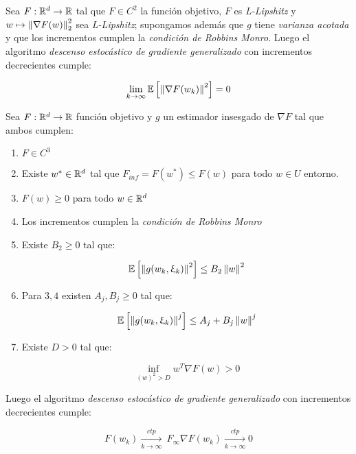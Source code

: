 \begin{theorem}
	Sea $F: {\mathbb{R}}^d \rightarrow {\mathbb{R}}$ tal que $F \in C^2$ la funci\'on objetivo, $F$ es \textit{L-Lipshitz} y $w \mapsto \left\lVert\nabla F (w)\right\rVert_2^2$ sea \textit{L-Lipshitz}; supongamos adem\'as que $g$ tiene \textit{varianza acotada} y que los incrementos cumplen la \textit{condici\'on de Robbins Monro}. Luego el algoritmo \textit{descenso estoc\'astico de gradiente generalizado} con incrementos decrecientes cumple:
	
	\begin{equation*}
	\lim\limits_{k \rightarrow \infty} \mathbb{E} \left[\left\lVert\nabla F (w_k)\right\rVert^2\right] = 0
	\end{equation*}
	
\end{theorem}

\begin{theorem}
	Sea $F: {\mathbb{R}}^d \rightarrow {\mathbb{R}}$  funci\'on objetivo y  $g$ un estimador insesgado de $\nabla F$ tal que ambos cumplen:
	
		\begin{enumerate}
		\item $F \in C^3$
		\item Existe $w^* \in {\mathbb{R}}^d$ tal que $F_{inf} = F(w^*) \leq F(w)$ para todo $w \in U$ entorno.
		\item $F(w) \geq 0$ para todo $w \in {\mathbb{R}}^d$
		\item Los incrementos cumplen la \textit{condici\'on de Robbins Monro}
		\item Existe $B_2 \geq 0$ tal que:
		
		\begin{equation*}
		\mathbb{E} \left[\left\lVert g(w_k, \upxi_{k})\right\rVert^2\right] \leq B_2 \left\lVert w\right\rVert^2
		\end{equation*}		
		
		\item Para $3, 4$ existen $A_j,B_j \geq 0$ tal que:
		
		\begin{equation*}
		\mathbb{E} \left[\left\lVert g(w_k, \upxi_{k})\right\rVert^j\right] \leq A_j + B_j \left\lVert w\right\rVert^j
		\end{equation*}
		
		\item  Existe $D > 0$ tal que:
		
		\begin{equation*}
		\inf\limits_{(w)^2 > D} {w^T \nabla F(w)} >0
		\end{equation*}
	\end{enumerate}
	
	
	Luego el algoritmo \textit{descenso estoc\'astico de gradiente generalizado} con incrementos decrecientes cumple:
	
	\begin{subequations}
		\begin{equation*}
		F(w_k) \xrightarrow[k \rightarrow \infty]{ctp} \ F_{\infty}
		\end{equation*}
		\begin{equation*}
		\nabla F(w_k) \xrightarrow[k \rightarrow \infty]{ctp} 0
		\end{equation*}
	\end{subequations}
	
\end{theorem}
